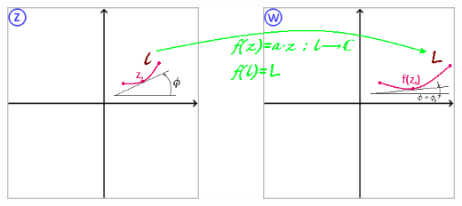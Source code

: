 \documentclass[../../main.tex]{subfiles}
\begin{document}
\begin{enumerate}
\begin{enumerate}
\begin{enumerate}
			 \includegraphics[height=0.4\textwidth]{lec25_4.png}
			 
		\end{enumerate}
	\end{enumerate}
 \end{enumerate}
\end{document}
